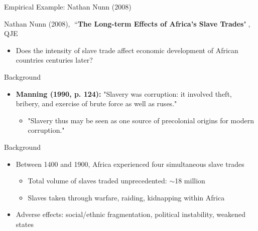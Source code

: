 \documentclass[hyperref={pdfpagelabels=false}]{beamer}
\begin{document}





\date
{}


\begin{frame}{}
\titlepage
\end{frame}



\begin{frame}{Empirical Example: Nathan Nunn (2008)}

Nathan Nunn (2008), ``\textbf{The Long-term Effects of Africa's Slave Trades}", QJE
					\vspace{0.2cm}
\begin{itemize}
	\item Does the intensity of slave trade affect economic development of African countries centuries later?
\end{itemize}
\end{frame}



	


\begin{frame}{Background}
\begin{itemize}
	\item \textbf{Manning (1990, p. 124):} "Slavery was corruption: it involved theft, bribery, and exercise of brute force as well as ruses."
					\vspace{0.2cm}
					\begin{itemize}
	\item "Slavery thus may be seen as one source of precolonial origins
	for modern corruption."
\end{itemize}
\end{itemize}
\end{frame}


\begin{frame}{Background}
\begin{itemize}
	\item Between 1400 and 1900, Africa experienced four simultaneous slave trades
						\vspace{0.2cm}
									\begin{itemize}		
	\item Total volume of slaves traded unprecedented: $\sim$18 million
						\vspace{0.2cm}
	\item Slaves taken through warfare, raiding, kidnapping within Africa
						\vspace{0.2cm}
	\end{itemize}				
	\item Adverse effects: social/ethnic fragmentation, political instability, weakened states
\end{itemize}
\end{frame}
\end{document}
